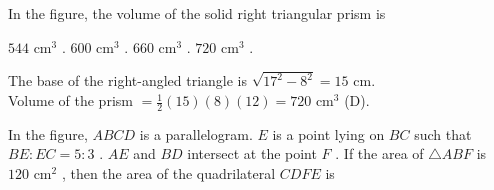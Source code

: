 
\question In the figure, the volume of the solid right triangular prism is

\begin{minipage}{0.45\textwidth}
\begin{choices}
    \choice $544\text{ cm}^3$ .
    \choice $600\text{ cm}^3$ .
    \choice $660\text{ cm}^3$ .
    \correctchoice $720\text{ cm}^3$ .
\end{choices}
\end{minipage}
\begin{minipage}{0.52\textwidth}
\centering
{}
\end{minipage}
\begin{solution}
The base of the right-angled triangle is $\sqrt{17^2 - 8^2} = 15\text{ cm}$. \\
Volume of the prism $= \frac{1}{2}(15)(8)(12) = 720\text{ cm}^3$ (D).
\end{solution}

\question In the figure, $ABCD$ is a parallelogram. $E$ is a point lying on $BC$ such that $BE : EC = 5 : 3$ . $AE$ and $BD$ intersect at the point $F$ . If the area of $\triangle ABF$ is $120\text{ cm}^2$ , then the area of the quadrilateral $CDFE$ is


